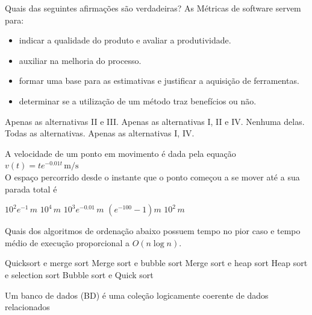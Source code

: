 \documentclass[12pt, addpoints]{exam}
\begin{document}
\begin{questions}
\question

Quais das seguintes afirmações são verdadeiras? As Métricas de software servem para:



\begin{itemize}

    \item[I)] indicar a qualidade do produto e avaliar a produtividade.

    \item[II)] auxiliar na melhoria do processo.

    \item[III)] formar uma base para as estimativas e justificar a aquisição de ferramentas.

    \item[IV)] determinar se a utilização de um método traz benefícios ou não.

\end{itemize}
\begin{choices}
\choice Apenas as alternativas II e III.
\choice Apenas as alternativas I, II e IV.
\choice Nenhuma delas.
\choice Todas as alternativas.
\choice Apenas as alternativas I, IV.
\end{choices}

\question

A velocidade de um ponto em movimento é dada pela equação\\

$v(t) = t e^{-0.01t} \, \text{m/s}$\\

O espaço percorrido desde o instante que o ponto começou a se mover até a sua parada total é


\begin{choices}
\choice \( 10^2 e^{-1} \, m \)
\choice \( 10^4 \, m \)
\choice \( 10^3 e^{-0.01} \, m \)
\choice \( (e^{-100} - 1) m \)
\choice \( 10^2 \, m \)
\end{choices}

\question

Quais dos algoritmos de ordenação abaixo possuem tempo no pior caso e tempo médio de execução proporcional a \( O(n \log n) \).
\begin{choices}
\choice Quicksort e merge sort
\choice Merge sort e bubble sort
\choice Merge sort e heap sort
\choice Heap sort e selection sort
\choice Bubble sort e Quick sort
\end{choices}

\question

Um banco de dados (BD) é uma coleção logicamente coerente de dados relacionados


\end{questions}
\end{document}
